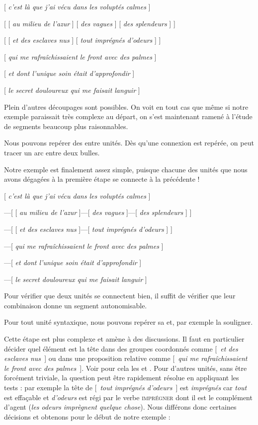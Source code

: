 \ea{}
[ \textit{c’est là que j’ai vécu dans les voluptés calmes} ]

[ [ \textit{au milieu de l’azur} ] [ \textit{des vagues} ] [ \textit{des splendeurs} ] ]

[ [ \textit{et des esclaves nus} ] [ \textit{tout imprégnés d’odeurs} ] ]

[ \textit{qui me rafraîchissaient le front avec des palmes} ]

[ \textit{et dont l’unique soin était d’approfondir} ]

[ \textit{le secret douloureux qui me faisait languir} ]
\z

Plein d’autres découpages sont possibles. On voit en tout cas que même si notre exemple paraissait très complexe au départ, on s’est maintenant ramené à l’étude de segments beaucoup plus raisonnables.

\begin{tblsframed}{}
\noindent Nous pouvons repérer des  entre unités. Dès qu’une connexion est repérée, on peut tracer un arc entre deux bulles.
\end{tblsframed}

Notre exemple est finalement assez simple, puisque chacune des unités que nous avons dégagées à la première étape se connecte à la précédente !

\ea{}
[ \textit{c’est là que j’ai vécu dans les voluptés calmes} ]

—[ [ \textit{au milieu de l’azur} ]—[ \textit{des vagues} ]—[ \textit{des splendeurs} ] ]

—[ [ \textit{et des esclaves nus} ]—[ \textit{tout imprégnés d’odeurs} ] ]

—[ \textit{qui me rafraîchissaient le front avec des palmes} ]

—[ \textit{et dont l’unique soin était d’approfondir} ]

—[ \textit{le secret douloureux qui me faisait languir} ]
\z

Pour vérifier que deux unités se connectent bien, il suffit de vérifier que leur combinaison donne un segment autonomisable.

\begin{tblsframed}{}
\noindent Pour tout unité syntaxique, nous pouvons repérer sa  et, par exemple la souligner.
\end{tblsframed}

Cette étape est plus complexe et amène à des discussions. Il faut en particulier décider quel élément est la tête dans des groupes coordonnés comme [~\textit{et des esclaves nus~}] ou dans une proposition relative comme [~\textit{qui me rafraîchissaient le front avec des palmes~}]. Voir pour cela les   et . Pour d’autres unités, sans être forcément triviale, la question peut être rapidement résolue en appliquant les tests : par exemple la tête de [~\textit{tout imprégnés d’odeurs~}] est \textit{imprégnés} car \textit{tout} est effaçable et \textit{d’odeurs} est régi par le verbe \textsc{imprégner} dont il est le complément d’agent (\textit{les odeurs imprègnent quelque chose}). Nous différons donc certaines décisions et obtenons pour le début de notre exemple :

